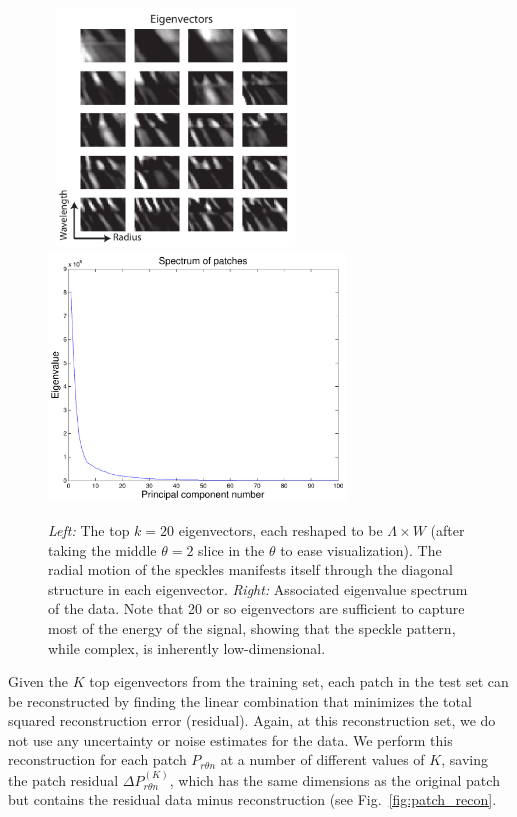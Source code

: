 \documentclass[12pt,pdftex,preprint]{aastex}
\newcommand{\fig}[1]{Fig.\ \ref{fig:#1}}
\begin{document}
\begin{figure}[h!]
\begin{center}
\mbox{
\includegraphics[width=2.5in]{figs/eigenvectors.pdf}
\includegraphics[width=3.1in]{figs/spectrum.pdf}
}
\end{center}
\vspace{-7mm}
\caption{{\em Left:} The top $k=20$ eigenvectors, each reshaped to be
 $\Lambda \times W$ (after taking the middle $\theta=2$ slice in the
 $\theta$ to ease visualization). The radial motion of the speckles
 manifests itself through the diagonal structure in each eigenvector. {\em Right:} Associated
 eigenvalue spectrum of the data. Note that 20 or so eigenvectors are
 sufficient to capture most of the energy of the signal, showing that
the speckle pattern, while complex, is inherently low-dimensional.}
\label{fig:spectrum}
\end{figure}

Given the $K$ top eigenvectors from the training set, each patch in
the test set can be reconstructed by finding the linear combination
that minimizes the total squared reconstruction error (residual).
Again, at this reconstruction set, we do not use any uncertainty or
noise estimates for the data.  We perform this reconstruction for each
patch $P_{r \theta n}$ at a number of different values of $K$, saving
the patch residual $\Delta P^{(K)}_{r \theta n}$, which has the same
dimensions as the original patch but contains the residual data minus
reconstruction (see \fig{patch_recon}.
\end{document}

